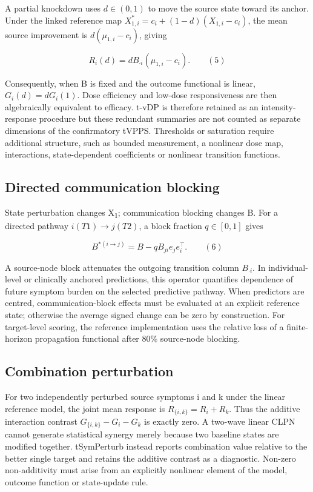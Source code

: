 \documentclass[11pt]{article}
\begin{document}
A partial knockdown uses \(d\in(0,1)\) to move the source state toward its
anchor. Under the linked reference map \(X_{1,i}^{\ast}=c_i+(1-d)(X_{1,i}-c_i)\), the mean
source improvement is \(d(\mu_{1,i}-c_i)\), giving

\[R_{i}(d) = dB_{\cdot i}\left( \mu_{1,i} - c_{i} \right).\quad\quad(5)\]

Consequently, when B is fixed and the outcome functional is linear,
\(G_i(d)=dG_i(1)\). Dose efficiency and low-dose responsiveness are then
algebraically equivalent to efficacy. t-vDP is therefore retained as an
intensity-response procedure but these redundant summaries are not
counted as separate dimensions of the confirmatory tVPPS. Thresholds or
saturation require additional structure, such as bounded measurement, a
nonlinear dose map, interactions, state-dependent coefficients or
nonlinear transition functions.

\subsection{Directed communication
blocking}\label{directed-communication-blocking}

State perturbation changes X\textsubscript{1}; communication blocking changes B. For a
directed pathway \(i(T1)\rightarrow j(T2)\), a block fraction \(q\in[0,1]\) gives

\[B^{\ast (i \rightarrow j)} = B - qB_{ji}e_{j}e_{i}^{\top}.\quad\quad(6)\]

A source-node block attenuates the outgoing transition column \(B_{\cdot i}\). In
individual-level or clinically anchored predictions, this operator
quantifies dependence of future symptom burden on the selected
predictive pathway. When predictors are centred, communication-block
effects must be evaluated at an explicit reference state; otherwise the
average signed change can be zero by construction. For target-level
scoring, the reference implementation uses the relative loss of a
finite-horizon propagation functional after 80\% source-node blocking.

\subsection{Combination perturbation}\label{combination-perturbation}

For two independently perturbed source symptoms i and k under the linear
reference model, the joint mean response is \(R_{\{i,k\}}=R_i+R_k\). Thus the
additive interaction contrast \(G_{\{i,k\}}-G_i-G_k\) is exactly zero. A two-wave
linear CLPN cannot generate statistical synergy merely because two
baseline states are modified together. tSymPerturb instead reports
combination value relative to the better single target and retains the
additive contrast as a diagnostic. Non-zero non-additivity must arise
from an explicitly nonlinear element of the model, outcome function or
state-update rule.
\end{document}
